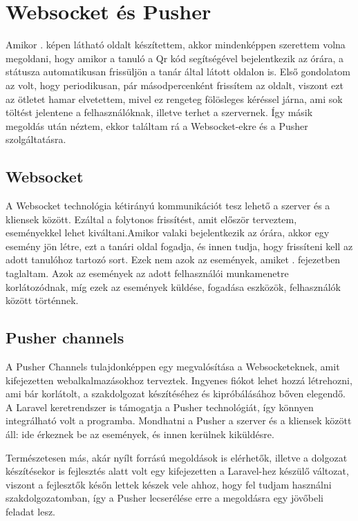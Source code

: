 \documentclass[
]{thesis-ekf}
\theoremstyle{definition}
\theoremstyle{remark}
\begin{document}
\section{Websocket és Pusher}

Amikor . képen látható oldalt készítettem, akkor mindenképpen szerettem volna megoldani, hogy amikor a tanuló a Qr kód segítségével bejelentkezik az órára, a státusza automatikusan frissüljön a tanár által látott oldalon is. Első gondolatom az volt, hogy periodikusan, pár másodpercenként frissítem az oldalt, viszont ezt az ötletet hamar elvetettem, mivel ez rengeteg fölösleges kéréssel járna, ami sok töltést jelentene a felhasználóknak, illetve terhet a szervernek. Így másik megoldás után néztem, ekkor találtam rá a Websocket-ekre és a Pusher szolgáltatásra.

\subsection{Websocket}

A Websocket technológia kétirányú kommunikációt tesz lehető a szerver és a kliensek között. Ezáltal a folytonos frissítést, amit először terveztem, eseményekkel lehet kiváltani.\cite{websocket}Amikor valaki bejelentkezik az órára, akkor egy esemény jön létre, ezt a tanári oldal fogadja, és innen tudja, hogy frissíteni kell az adott tanulóhoz tartozó sort. Ezek nem azok az események, amiket . fejezetben taglaltam. Azok az események az adott felhasználói munkamenetre korlátozódnak, míg ezek az események küldése, fogadása eszközök, felhasználók között történnek.

\subsection{Pusher channels}

A Pusher Channels\cite{pusher} tulajdonképpen egy megvalósítása a Websocketeknek, amit kifejezetten webalkalmazásokhoz terveztek. Ingyenes fiókot lehet hozzá létrehozni, ami bár korlátolt, a szakdolgozat készítéséhez és kipróbálásához bőven elegendő. A Laravel keretrendszer is támogatja a Pusher technológiát, így könnyen integrálható volt a programba. Mondhatni a Pusher a szerver és a kliensek között áll: ide érkeznek be az események, és innen kerülnek kiküldésre.

Természetesen más, akár nyílt forrású megoldások is elérhetők, illetve a dolgozat készítésekor is fejlesztés alatt volt egy kifejezetten a Laravel-hez készülő változat, viszont a fejlesztők későn lettek készek vele ahhoz, hogy fel tudjam használni szakdolgozatomban, így a Pusher lecserélése erre a megoldásra egy jövőbeli feladat lesz.
\end{document}
